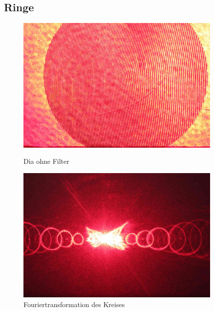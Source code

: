         \subsection*{Ringe}
            \begin{figure}[H]
                  \begin{minipage}{0.45\textwidth}
                   \centering
                    \includegraphics[width=0.9\textwidth]{Abb/Abb_8.JPG}
                    \caption{Dia ohne Filter}
                  \end{minipage}\hfill
                  \begin{minipage}{0.45\textwidth}
                   \centering
                    \includegraphics[width=0.9\textwidth]{Abb/Abb_9.JPG}
                    \caption{Fouriertransformation des Kreises}
                  \end{minipage}
            \end{figure}
